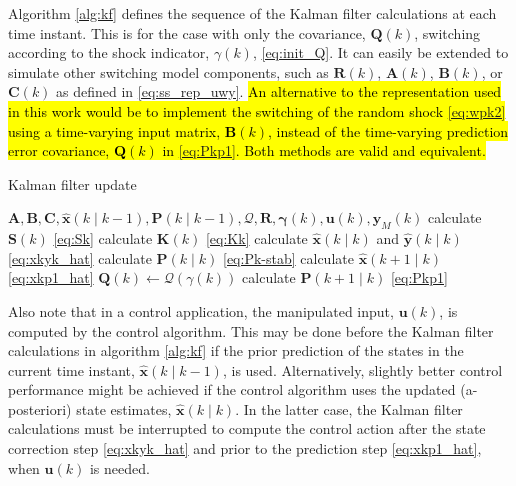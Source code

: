 {{Algorithm \ref{alg:kf} defines the sequence of the Kalman filter calculations at each time instant. 
%
This is for the case with only the covariance, $\mathbf{Q}(k)$, switching according to the shock indicator, $\gamma(k)$, \eqref{eq:init_Q}. It can easily be extended to simulate other switching model components, such as $\mathbf{R}(k)$, $\mathbf{A}(k)$, $\mathbf{B}(k)$, or $\mathbf{C}(k)$ as defined in \eqref{eq:ss_rep_uwy}. \hl{An alternative to the representation used in this work would be to implement the switching of the random shock {\eqref{eq:wpk2}} using a time-varying input matrix, $\mathbf{B}(k)$, instead of the time-varying prediction error covariance, $\mathbf{Q}(k)$ in {\eqref{eq:Pkp1}}. Both methods are valid and equivalent.}
\begin{algorithm}
	\caption{Kalman filter update}\label{alg:kf}
	\begin{algorithmic}
		\Require $\mathbf{A},\mathbf{B},\mathbf{C},\mathbf{\hat{x}}(k \mid k-1), \mathbf{P}(k \mid k-1), \mathcal{Q}, \mathbf{R}, \mathbf{\gamma}(k), \mathbf{u}(k), \mathbf{y}_M(k)$
		\State calculate $\mathbf{S}(k)$ \eqref{eq:Sk}
		\State calculate $\mathbf{K}(k)$ \eqref{eq:Kk}
		\State calculate $\mathbf{\hat{x}}(k \mid k)$ and $\mathbf{\hat{y}}(k \mid k)$ \eqref{eq:xkyk_hat}
		\State calculate $\mathbf{P}(k \mid k)$ \eqref{eq:Pk-stab}
		\State calculate $\mathbf{\hat{x}}(k+1 \mid k)$ \eqref{eq:xkp1_hat}
		\State $\mathbf{Q}(k) \gets \mathcal{Q}(\gamma(k))$
		\State calculate $\mathbf{P}(k+1 \mid k)$ \eqref{eq:Pkp1}
	\end{algorithmic}
\end{algorithm}

Also note that in a control application, the manipulated input, $\mathbf{u}(k)$, is computed by the control algorithm. This may be done before the Kalman filter calculations in algorithm \ref{alg:kf} if the prior prediction of the states in the current time instant, $\hat{\mathbf{x}}(k \mid k-1)$, is used. Alternatively, slightly better control performance might be achieved if the control algorithm uses the updated (a-posteriori) state estimates, $\hat{\mathbf{x}}(k \mid k)$. In the latter case, the Kalman filter calculations must be interrupted to compute the control action after the state correction step \eqref{eq:xkyk_hat} and prior to the prediction step \eqref{eq:xkp1_hat}, when $\mathbf{u}(k)$ is needed.

}}
